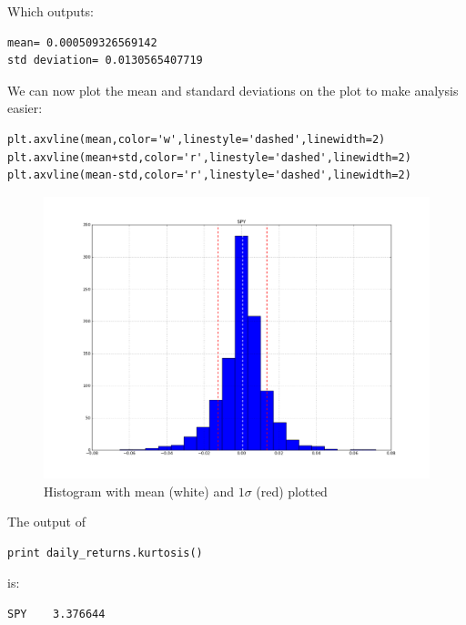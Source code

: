 \noindent\begin{minipage}{\linewidth}
\noindent Which outputs:
\begin{lstlisting}[style=python]
mean= 0.000509326569142
std deviation= 0.0130565407719
\end{lstlisting}
\end{minipage}

\noindent\begin{minipage}{\linewidth}
\noindent We can now plot the mean and standard deviations on the plot to make analysis easier:
\begin{lstlisting}[style=python]
plt.axvline(mean,color='w',linestyle='dashed',linewidth=2)
plt.axvline(mean+std,color='r',linestyle='dashed',linewidth=2)
plt.axvline(mean-std,color='r',linestyle='dashed',linewidth=2)
\end{lstlisting}
\end{minipage}

\begin{figure}[h!]
	\centering
	\includegraphics[width=\textwidth]{images/histograms_2.png}
    \caption{Histogram with mean (white) and $1\sigma$ (red) plotted}
\end{figure}

\noindent\begin{minipage}{\linewidth}
\noindent The output of
\begin{lstlisting}[style=python]
print daily_returns.kurtosis()
\end{lstlisting}
\end{minipage}

\noindent\begin{minipage}{\linewidth}
\noindent is:
\begin{lstlisting}[style=python]
SPY    3.376644
\end{lstlisting}
\end{minipage}

